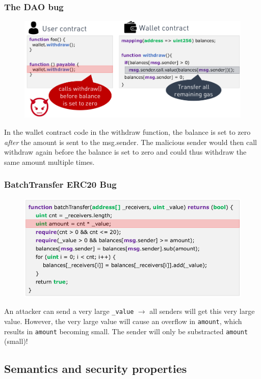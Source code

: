 \documentclass[11pt,oneside,a4paper]{article}
\begin{document}
\subsubsection{The DAO bug}

\vspace{-\topsep}
\begin{figure}[hb!]
	\centering
	\includegraphics[width=0.5\linewidth]{figures/dao_bug}
	\label{fig:daobug}
\end{figure}
\vspace{-\topsep}

In the wallet contract code in the withdraw function, the balance is set to zero \textit{after} the amount is sent to the msg.sender. The malicious sender would then call withdraw again before the balance is set to zero and could thus withdraw the same amount multiple times.

\subsubsection{BatchTransfer ERC20 Bug}

\begin{figure}[hb!]
	\centering
	\includegraphics[width=0.5\linewidth]{figures/batchoverflow_exploit}
	\label{fig:batchoverflowexploit}
\end{figure}
\vspace{-\topsep}

An attacker can send a very large \texttt{\_value} $\rightarrow$ all senders will get this very large value. However, the very large value will cause an overflow in \texttt{amount}, which results in \texttt{amount} becoming small. The sender will only be substracted \texttt{amount} (small)!

\subsection{Semantics and security properties}



\titlespacing{\subsection}{0pt}{2ex}{2ex}

\label{lastpage} %
\clearpage
{}



\clearpage
\appendix
{}
\end{document}
